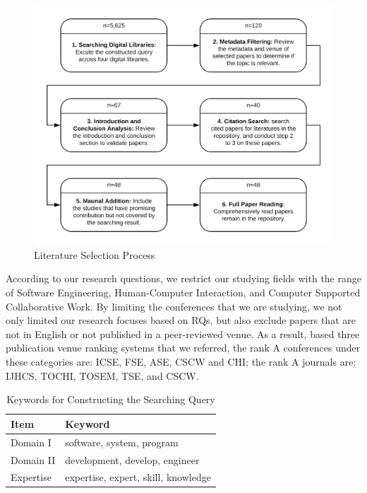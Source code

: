 \begin{figure}
\includegraphics[width = \columnwidth]{process}
  \caption{Literature Selection Process}
  \label{fig:process}
\end{figure}

According to our research questions, we restrict our studying fields with the range of Software Engineering, Human-Computer Interaction, and Computer Supported Collaborative Work. By limiting the conferences that we are studying, we not only limited our research focuses based on RQs, but also exclude papers that are not in English or not published in a peer-reviewed venue. As a result, based three publication venue ranking systems that we referred, the rank A conferences under these categories are: ICSE, FSE, ASE, CSCW and CHI; the rank A journals are: IJHCS, TOCHI, TOSEM, TSE, and CSCW.

\begin{table}[tbp]
\centering
\begin{tabular}{l l}
\hline
\textbf{Item}      & {\textbf{Keyword}}                              \\ \hline
Domain I  & software, system, program          \\ 
Domain II & development, develop, engineer       \\ 
Expertise & expertise, expert, skill, knowledge \\ \hline
\end{tabular}
\caption{Keywords for Constructing the Searching Query}
\label{table:keyword}
\end{table}


